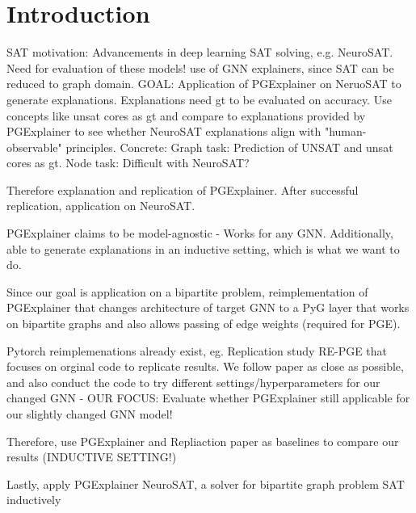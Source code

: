 \chapter{Introduction}
\label{ch:Introduction}

SAT motivation: Advancements in deep learning SAT solving, e.g. NeuroSAT. Need for evaluation of these models! use of GNN explainers, since SAT can be reduced to graph domain. GOAL: Application of PGExplainer on NeruoSAT to generate explanations. Explanations need gt to be evaluated on accuracy. Use concepts like unsat cores as gt and compare to explanations provided by PGExplainer to see whether NeuroSAT explanations align with "human-observable" principles.
Concrete: Graph task: Prediction of UNSAT and unsat cores as gt. Node task: Difficult with NeuroSAT?\bigskip

Therefore explanation and replication of PGExplainer. After successful replication, application on NeuroSAT. \bigskip

PGExplainer claims to be model-agnostic - Works for any GNN. Additionally, able to generate explanations in an inductive setting, which is what we want to do.\bigskip

Since our goal is application on a bipartite problem, reimplementation of PGExplainer that changes architecture of target GNN to a PyG layer that works on bipartite graphs and also allows passing of edge weights (required for PGE).\bigskip

Pytorch reimplemenations already exist, eg. Replication study RE-PGE that focuses on orginal code to replicate results. We follow paper as close as possible, and also conduct the code to try different settings/hyperparameters for our changed GNN - OUR FOCUS: Evaluate whether PGExplainer still applicable for our slightly changed GNN model!\bigskip

Therefore, use PGExplainer and Repliaction paper as baselines to compare our results (INDUCTIVE SETTING!) \bigskip

Lastly, apply PGExplainer NeuroSAT, a solver for bipartite graph problem SAT inductively